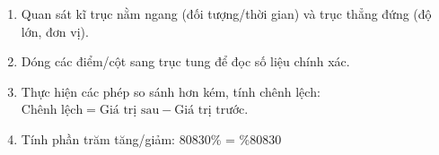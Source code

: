 \begin{enumerate}
\item Quan sát kĩ trục nằm ngang (đối tượng/thời gian) và trục thẳng đứng (độ lớn, đơn vị).
\item Dóng các điểm/cột sang trục tung để đọc số liệu chính xác.
\item Thực hiện các phép so sánh hơn kém, tính chênh lệch: $\text{Chênh lệch} = \text{Giá trị sau} - \text{Giá trị trước}$.
\item Tính phần trăm tăng/giảm:
80830\%  =  \%80830
\end{enumerate}
